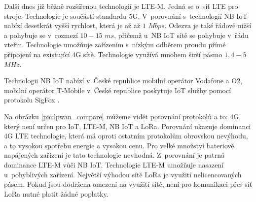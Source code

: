 Další dnes již běžně rozšířenou technologií je LTE-M. Jedná se o~síť LTE pro stroje. Technologie je součástí standardu 5G. V~porovnání s~technologií NB IoT nabízí desetkrát vyšší rychlost, která je až až $1$ $Mbps$. Odezva je také řádově nižší a pohybuje se v~rozmezí $10-15$ $ms$, přičemž u~NB IoT sítě se pohybuje v~řádu vteřin. Technologie umožňuje zařízením s~nízkým odběrem proudu přímé připojení na existující 4G sítě. Technologie využívá mnohem širší pásmo $1,4 - 5$ $MHz$.

Technologii NB IoT nabízí v~České republice mobilní operátor Vodafone a O2, mobilní operátor T-Mobile v~České republice poskytuje IoT služby pomocí protokolu SigFox \cite{IOT_CR}.


Na obrázku \ref{pic:lpwan_compare} můžeme vidět porovnání protokolů a to: 4G, který není určen pro IoT, LTE-M, NB IoT a LoRa. Porovnání ukazuje dominanci 4G LTE technologie, která má oproti ostatním protokolům obrovskou nevýhodu, a to vysokou spotřebu energie a vysokou cenu. Pro velké množství bateriově napájených zařízení je tato technologie nevhodná. Z~porovnání je patrná dominance LTE-M vůči NB IoT. Technologie LTE-M umožňuje nasazení u~pohyblivých zařízení. Největší výhodou sítě LoRa je využití nelicencovaných pásem. Pokud jsou dodržena omezení na využití sítě, není pro komunikaci přes síť LoRa nutné platit žádné poplatky.

